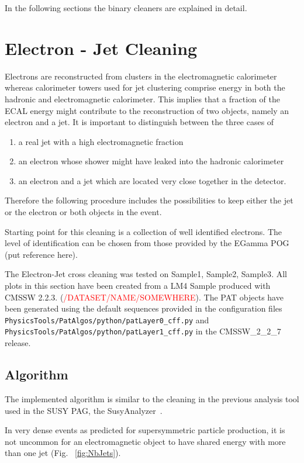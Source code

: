 \documentclass{cmspaper}
\begin{document}
In the following sections the binary cleaners are explained in detail.


\section{Electron - Jet Cleaning}
\label{sec:ElecJet}
Electrons are reconstructed from clusters in the electromagnetic calorimeter
whereas calorimeter towers used for jet clustering comprise energy in both the hadronic
and electromagnetic calorimeter. This implies that a fraction of the ECAL energy
might contribute to the reconstruction of two objects, namely an electron and a
jet. It is important to distinguish between the three cases of
\begin{enumerate}
\item  a real jet with a high electromagnetic fraction
\item an electron whose shower might have leaked into the hadronic
    calorimeter
\item an electron and a jet which are located very close together in the
    detector.
\end{enumerate}
Therefore the following procedure includes the possibilities to keep either the
jet or the electron or both objects in the event.

Starting point for this cleaning is a collection of well identified electrons.
The level of identification can be chosen from those provided by the EGamma POG
{\color{red}(put reference here)}.

The Electron-Jet cross cleaning was tested on {\color{red}Sample1, Sample2,
Sample3}. All plots in this section have been created from a LM4 Sample produced
with CMSSW 2.2.3. (\textcolor{red}{/DATASET/NAME/SOMEWHERE}). The PAT objects
have been generated using the default sequences provided in the configuration
files
\texttt{PhysicsTools/PatAlgos/python/patLayer0\_cff.py} and
\texttt{PhysicsTools/PatAlgos/python/patLayer1\_cff.py} in the CMSSW\_2\_2\_7
release.

\subsection{Algorithm}
The implemented algorithm is similar to the cleaning in the previous analysis
tool used in the SUSY PAG, the SusyAnalyzer~\cite{SusyAnalyzer}.

In very dense events as predicted for supersymmetric particle production, it is
not uncommon for an electromagnetic object to have shared energy with more than one jet (Fig. ~\ref{fig:NbJets}).
\end{document}
